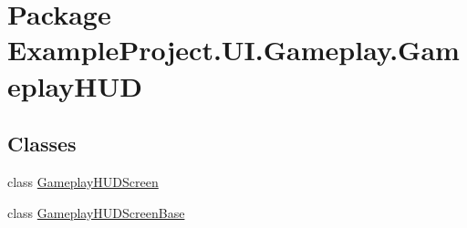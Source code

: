 \hypertarget{namespace_example_project_1_1_u_i_1_1_gameplay_1_1_gameplay_h_u_d}{}\section{Package Example\+Project.\+U\+I.\+Gameplay.\+Gameplay\+H\+U\+D}
\label{namespace_example_project_1_1_u_i_1_1_gameplay_1_1_gameplay_h_u_d}
\subsection*{Classes}
\begin{DoxyCompactItemize}
\item 
class \hyperlink{class_example_project_1_1_u_i_1_1_gameplay_1_1_gameplay_h_u_d_1_1_gameplay_h_u_d_screen}{Gameplay\+H\+U\+D\+Screen}
\item 
class \hyperlink{class_example_project_1_1_u_i_1_1_gameplay_1_1_gameplay_h_u_d_1_1_gameplay_h_u_d_screen_base}{Gameplay\+H\+U\+D\+Screen\+Base}
\end{DoxyCompactItemize}
